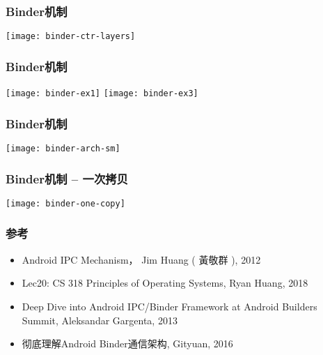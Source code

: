 \begin{frame}[plain]
	\frametitle{Binder机制}
	\centering
	\texttt{[image: binder-ctr-layers]}
	
\end{frame}

\begin{frame}[plain]
	\frametitle{Binder机制}
	\centering
	
\texttt{[image: binder-ex1]}
\texttt{[image: binder-ex3]}
	
\end{frame}

\begin{frame}[plain]
	\frametitle{Binder机制 }
	
	\texttt{[image: binder-arch-sm]}
	
\end{frame}
\begin{frame}[plain]
	\frametitle{Binder机制 -- 一次拷贝}

	\texttt{[image: binder-one-copy]}

\end{frame}

\begin{frame}[plain]
	\frametitle{参考}
	
			\begin{itemize}
				\item Android IPC Mechanism， Jim Huang ( 黃敬群 ), 2012
				\item Lec20: CS 318 Principles of Operating Systems, Ryan Huang, 2018			
				\item Deep Dive into Android IPC/Binder Framework at Android Builders Summit, Aleksandar Gargenta, 2013				
				\item 彻底理解Android Binder通信架构, Gityuan, 2016
			\end{itemize}
	
\end{frame}

